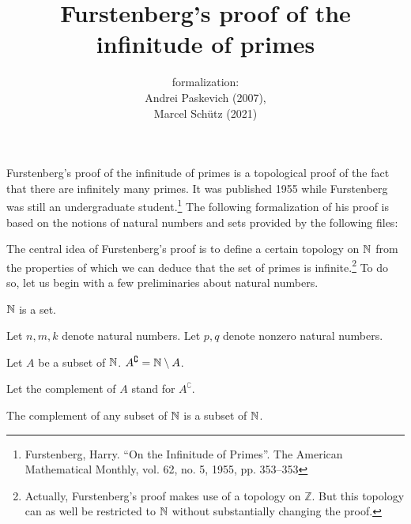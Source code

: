 \documentclass{article}
\title{Furstenberg's proof of the infinitude of primes}
\author{\Naproche formalization: \vspace{0.5em} \\
Andrei Paskevich (2007), \\
Marcel Schütz (2021)}
\date{}
\newcommand{\Int}{\mathbb{Z}}
\begin{document}
  \maketitle

  Furstenberg's proof of the infinitude of primes is a topological proof of the
  fact that there are infinitely many primes.
  It was published 1955 while Furstenberg was still an undergraduate
  student.\footnote{Furstenberg, Harry. \enquote{On the Infinitude of Primes}.
  The American Mathematical Monthly, vol. 62, no. 5, 1955, pp. 353–353}
  The following formalization of his proof is based on the notions of natural
  numbers and sets provided by the following files:

  \begin{forthel}
  \end{forthel}

  \begin{forthel}
  \end{forthel}

  \begin{forthel}
  \end{forthel}

  The central idea of Furstenberg's proof is to define a certain topology on
  $\mathbb{N}$ from the properties of which we can deduce that the set of
  primes is infinite.\footnote{Actually, Furstenberg's proof makes use of a
  topology on $\Int$. But this topology can as well be restricted to
  $\mathbb{N}$ without substantially changing the proof.}
  To do so, let us begin with a few preliminaries about natural numbers.

  \begin{forthel}
    \begin{axiom}
      $\mathbb{N}$ is a set.
    \end{axiom}

    Let $n,m,k$ denote natural numbers.
    Let $p,q$ denote nonzero natural numbers.

    \begin{definition}
      Let $A$ be a subset of $\mathbb{N}$.
      $A^{\complement} = \mathbb{N} \setminus A$.
    \end{definition}

    Let the complement of $A$ stand for $A^{\complement}$.

    \begin{lemma}
      The complement of any subset of $\mathbb{N}$ is a subset of $\mathbb{N}$.
    \end{lemma}
  \end{forthel}
\end{document}
